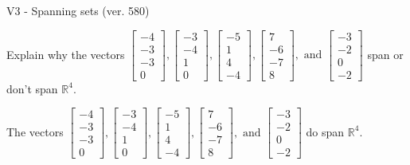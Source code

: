 \begin{exercise}
  \begin{exerciseTitle}V3 - Spanning sets (ver. 580)\end{exerciseTitle}
  \begin{exerciseStatement}
    Explain why the vectors \(\left[\begin{array}{r}
-4 \\
-3 \\
-3 \\
0
\end{array}\right] , \left[\begin{array}{r}
-3 \\
-4 \\
1 \\
0
\end{array}\right] , \left[\begin{array}{r}
-5 \\
1 \\
4 \\
-4
\end{array}\right] , \left[\begin{array}{r}
7 \\
-6 \\
-7 \\
8
\end{array}\right] , \text{ and } \left[\begin{array}{r}
-3 \\
-2 \\
0 \\
-2
\end{array}\right]\) span or don't span \(\mathbb{R}^4\). 
	


  \end{exerciseStatement}
  \begin{exerciseAnswer}
   The vectors \(\left[\begin{array}{r}
-4 \\
-3 \\
-3 \\
0
\end{array}\right] , \left[\begin{array}{r}
-3 \\
-4 \\
1 \\
0
\end{array}\right] , \left[\begin{array}{r}
-5 \\
1 \\
4 \\
-4
\end{array}\right] , \left[\begin{array}{r}
7 \\
-6 \\
-7 \\
8
\end{array}\right] , \text{ and } \left[\begin{array}{r}
-3 \\
-2 \\
0 \\
-2
\end{array}\right]\) 
  	 do  
	span \(\mathbb{R}^4\).
  



\end{exerciseAnswer}
\end{exercise}
